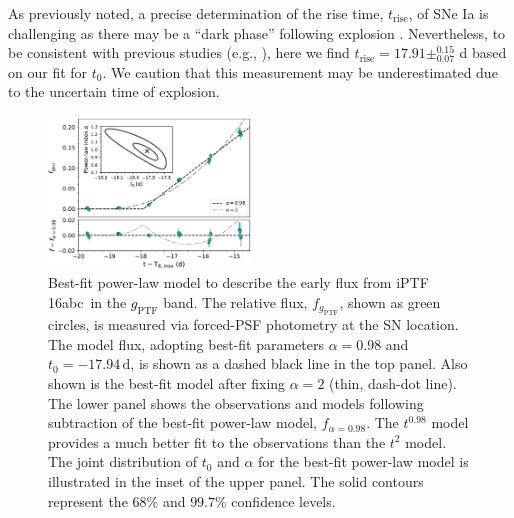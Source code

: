 \documentclass[twocolumn]{aastex61}
\newcommand{\abc}{iPTF\,16abc}
\begin{document}
As previously noted, a precise determination of the rise time, $t_\mathrm{rise}$, of SNe Ia is challenging as there may be a ``dark phase'' following explosion \citep{2014ApJ...784...85P}. Nevertheless, to be consistent with previous studies (e.g., \citealt{2011MNRAS.416.2607G}), here we find $t_\mathrm{rise} = 17.91\pm _{0.07}^{0.15}$ d based on our fit for $t_0$. We caution that this measurement may be underestimated due to the uncertain time of explosion. 

\begin{figure}[!htb]
  \centering
  \includegraphics[width=0.48\textwidth]{early_lc.pdf}
  \caption{Best-fit power-law model to describe the early flux 
  from \abc\ in the $g_\mathrm{PTF}$ band. The relative flux, 
  $f_{g_\mathrm{PTF}}$, shown as green circles, is measured via 
  forced-PSF photometry at the SN location. The model flux, 
  adopting best-fit parameters $\alpha=0.98$ and 
  $t_0=-17.94\,\textrm{d}$, is shown as a dashed black line in the 
  top panel. Also shown is the best-fit model after fixing 
  $\alpha=2$ (thin, dash-dot line). 
  The lower panel shows the observations and models following 
  subtraction of the best-fit power-law model, $f_{\alpha = 0.98}$.
  The $t^{0.98}$ model provides a much better fit to the 
  observations than the $t^2$ model.  
  The joint distribution of $t_0$ and $\alpha$ for the best-fit 
  power-law model is illustrated in the inset of the upper panel. 
  The solid contours represent the $68\%$ and $99.7\%$ confidence 
  levels. 
  }
  \label{fig:early_lc_fit}
\end{figure}
\end{document}
